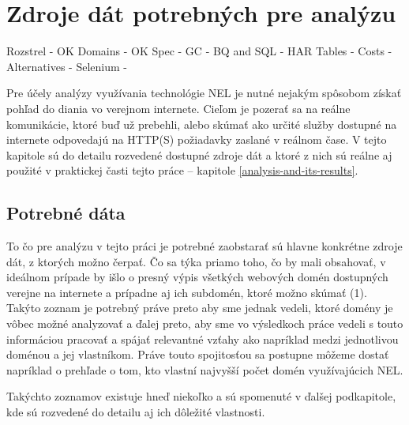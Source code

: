 \chapter{Zdroje dát potrebných pre analýzu}
\label{data-sources-available-for-research}

Rozstrel - OK
Domains  - OK
Spec     - 
GC       -
BQ and SQL     -
HAR Tables   -
Costs        -
Alternatives -
Selenium     - 


Pre účely analýzy využívania technológie NEL je nutné nejakým spôsobom získať pohľad do diania vo verejnom internete.
Cieľom je pozerať sa na reálne komunikácie, ktoré buď už prebehli, alebo skúmať ako určité služby dostupné na internete
odpovedajú na HTTP(S) požiadavky zaslané v reálnom čase. V tejto kapitole sú do detailu rozvedené dostupné zdroje dát 
a ktoré z nich sú reálne aj použité v praktickej časti tejto práce -- kapitole \ref{analysis-and-its-results}.

\section{Potrebné dáta}

To čo pre analýzu v tejto práci je potrebné zaobstarať sú hlavne konkrétne zdroje dát, z ktorých možno čerpať. Čo sa týka priamo toho,
čo by mali obsahovať, v ideálnom prípade by išlo o presný výpis všetkých webových domén dostupných verejne na internete 
a prípadne aj ich subdomén, ktoré možno skúmať (1). Takýto zoznam je potrebný práve preto aby sme jednak vedeli, ktoré domény
je vôbec možné analyzovať a ďalej preto, aby sme vo výsledkoch práce vedeli s touto informáciou pracovať a spájať 
relevantné vzťahy ako napríklad medzi jednotlivou doménou a jej vlastníkom. Práve touto spojitosťou sa postupne môžeme dostať napríklad 
o prehľade o tom, kto vlastní najvyšší počet domén využívajúcich NEL. 

Takýchto zoznamov existuje hneď niekoľko a sú spomenuté v ďalšej podkapitole, kde sú rozvedené do detailu aj ich dôležité vlastnosti.

